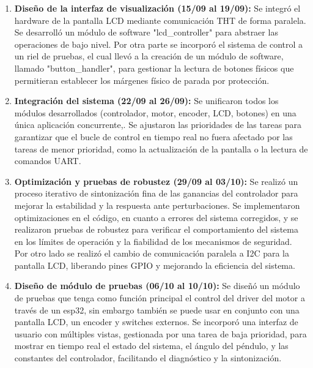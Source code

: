 \begin{enumerate}[label=\textbf{Semana \arabic*:}, leftmargin=*]
    \item \textbf{Diseño de la interfaz de visualización (15/09 al 19/09):}
    Se integró el hardware de la pantalla LCD mediante comunicación THT de forma paralela. Se desarrolló un módulo de software "lcd\_controller" para abstraer las operaciones de bajo nivel.
    Por otra parte se incorporó el sistema de control a un riel de pruebas, el cual llevó a la creación de un módulo de software, llamado "button\_handler", para gestionar la lectura de botones físicos que permitieran establecer los márgenes físico de parada por protección.

    \item \textbf{Integración del sistema (22/09 al 26/09):}
    Se unificaron todos los módulos desarrollados (controlador, motor, encoder, LCD, botones) en una única aplicación concurrente,. Se ajustaron las prioridades de las tareas para garantizar que el bucle de control en tiempo real no fuera afectado por las tareas de menor prioridad, como la actualización de la pantalla o la lectura de comandos UART.

    \item \textbf{Optimización y pruebas de robustez (29/09 al 03/10):}
    Se realizó un proceso iterativo de sintonización fina de las ganancias del controlador para mejorar la estabilidad y la respuesta ante perturbaciones. Se implementaron optimizaciones en el código, en cuanto a errores del sistema corregidos, y se realizaron pruebas de robustez para verificar el comportamiento del sistema en los límites de operación y la fiabilidad de los mecanismos de seguridad. Por otro lado se realizó el cambio de comunicación paralela a I2C para la pantalla LCD, liberando pines GPIO y mejorando la eficiencia del sistema.

    \item \textbf{Diseño de módulo de pruebas (06/10 al 10/10):}
    Se diseñó un módulo de pruebas que tenga como función principal el control del driver del motor a través de un esp32, sin embargo también se puede usar en conjunto con una pantalla LCD, un encoder y switches externos. Se incorporó una interfaz de usuario con múltiples vistas, gestionada por una tarea de baja prioridad, para mostrar en tiempo real el estado del sistema, el ángulo del péndulo, y las constantes del controlador, facilitando el diagnóstico y la sintonización.


\end{enumerate}
